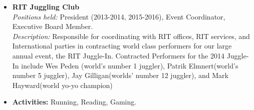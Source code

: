 \documentclass[10pt]{article}
\begin{document}
\vspace{1ex}
\begin{itemize} [topsep=.3ex, itemsep=0ex, partopsep=0ex, parsep=1ex]
	\item[] {\bf RIT Juggling Club}\\
	{\it Positions held:}  President (2013-2014, 2015-2016), Event Coordinator, Executive Board Member.\\
	{\it Description:} Responsible for coordinating with RIT offices, RIT services, and International parties in contracting world class performers for our large annual event, the RIT Juggle-In. Contracted Performers for the 2014 Juggle-In include Wes Peden (world's number 1 juggler), Patrik Elmnert(world's number 5 juggler), Jay Gilligan(worlds' number 12 juggler), and Mark Hayward(world yo-yo champion)  	
	\item[] {\bf Activities:} Running, Reading, Gaming.
\end{itemize}
\end{document}
